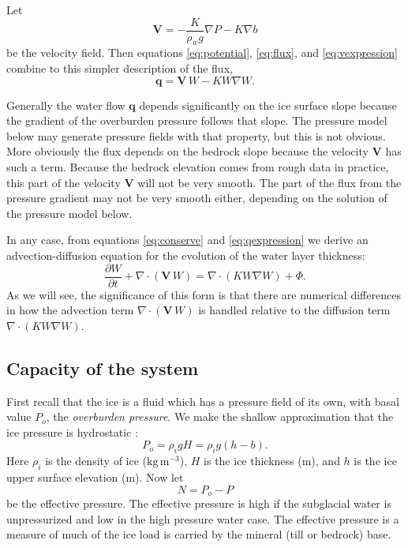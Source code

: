\documentclass[12pt,final]{amsart}%
\newcommand\bV{\mathbf{V}}
\newcommand\bq{\mathbf{q}}
\newcommand{\Div}{\nabla\cdot}
\newcommand{\grad}{\nabla}
\begin{document}
Let
\begin{equation} \label{eq:vexpression}
  \bV = - \frac{K}{\rho_w g} \grad P - K \grad b
\end{equation}
be the velocity field.  Then equations \eqref{eq:potential}, \eqref{eq:flux}, and \eqref{eq:vexpression} combine to this simpler description of the flux,
\begin{equation} \label{eq:qexpression}
  \bq = \bV\, W - K W \grad W.
\end{equation}

Generally the water flow $\bq$ depends significantly on the ice surface slope because the gradient of the overburden pressure follows that slope.  The pressure model below may generate pressure fields with that property, but this is not obvious.  More obviously the flux depends on the bedrock slope because the velocity $\bV$ has such a term.  Because the bedrock elevation comes from rough data in practice, this part of the velocity $\bV$ will not be very smooth.  The part of the flux from the pressure gradient may not be very smooth either, depending on the solution of the pressure model below.

In any case, from equations \eqref{eq:conserve} and \eqref{eq:qexpression} we derive an advection-diffusion equation \citep{HundsdorferVerwer2010,MortonMayers} for the evolution of the water layer thickness:
\begin{equation} \label{eq:adeqn}
  \frac{\partial W}{\partial t} + \Div\left(\bV\, W\right) = \Div \left(K W \grad W\right) + \Phi.
\end{equation}
As we will see, the significance of this form is that there are numerical differences in how the advection term $\Div\left(\bV\, W\right)$ is handled relative to the diffusion term $\Div \left(K W \grad W\right)$.

\subsection*{Capacity of the system}  First recall that the ice is a fluid which has a pressure field of its own, with basal value $P_o$, the \emph{overburden pressure}.  We make the shallow approximation that the ice pressure is hydrostatic \citep{GreveBlatter2009}:
\begin{equation} \label{eq:hydrostatic}
  P_o = \rho_i g H = \rho_i g (h-b).
\end{equation}
Here $\rho_i$ is the density of ice ($\text{kg}\,\text{m}^{-3}$), $H$ is the ice thickness (m), and $h$ is the ice upper surface elevation (m).  Now let
\begin{equation}
N = P_o - P\label{eq:effective}
\end{equation}
be the effective pressure.  The effective pressure is high if the subglacial water is unpressurized and low in the high pressure water case.  The effective pressure is a measure of much of the ice load is carried by the mineral (till or bedrock) base.
\end{document}
